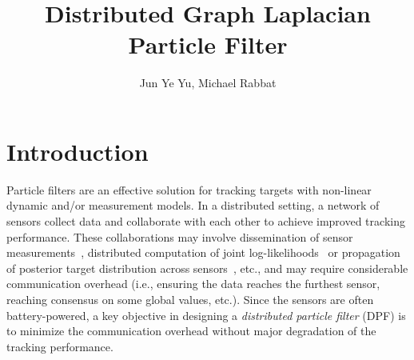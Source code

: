\documentclass[10pt,letterpaper,final]{article}
\title{Distributed Graph Laplacian Particle Filter}
\author{Jun Ye Yu, Michael Rabbat}
\begin{document}
\maketitle


\section{Introduction}
Particle filters are an effective solution for tracking targets with non-linear dynamic and/or measurement models. In a distributed setting, a network of sensors collect data and collaborate with each other to achieve improved tracking performance. These collaborations may involve dissemination of sensor measurements~\cite{Rosencrantz2003, Coates2004}, distributed computation of joint log-likelihoods~\cite{Hlinka2012, Mohammadi2014, Rabbat2016, Yu2016} or propagation of posterior target distribution across sensors~\cite{Yan2006}, etc., and may require considerable communication overhead (i.e., ensuring the data reaches the furthest sensor, reaching consensus on some global values, etc.). Since the sensors are often battery-powered, a key objective in designing a \textit{distributed particle filter} (DPF) is to minimize the communication overhead without major degradation of the tracking performance. 
\end{document}
